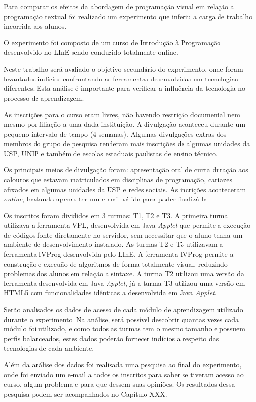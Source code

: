 Para comparar os efeitos da abordagem de programação visual em relação a programação textual foi realizado um experimento que inferiu a carga de trabalho incorrida aos alunos.

O experimento foi composto de um curso de Introdução à Programação desenvolvido no LInE sendo conduzido totalmente online.

Neste trabalho será avaliado o objetivo secundário do experimento, onde foram levantados indícios confrontando as ferramentas desenvolvidas em tecnologias diferentes. Esta análise é importante para verificar a influência da tecnologia no processo de aprendizagem.

As inscrições para o curso eram livres, não havendo restrição documental nem mesmo por filiação a uma dada instituição. A divulgação aconteceu durante um pequeno intervalo de tempo (4 semanas). Algumas divulgações extras dos membros do grupo de pesquisa renderam mais inscrições de algumas unidades da USP, UNIP e também de escolas estaduais paulistas de ensino técnico.

Os principais meios de divulgação foram: apresentação oral de curta duração aos calouros que estavam matriculados em disciplinas de programação, cartazes afixados em algumas unidades da USP e redes sociais. As incrições aconteceram \emph{online}, bastando apenas ter um e-mail válido para poder finalizá-la.

Os inscritos foram divididos em 3 turmas: T1, T2 e T3. A primeira turma utilizava a ferramenta VPL, desenvolvida em Java \emph{Applet} que permite a execução de códigos-fonte diretamente no servidor, sem necessitar que o aluno tenha um ambiente de desenvolvimento instalado. As turmas T2 e T3 utilizavam a ferramenta IVProg desenvolvida pelo LInE. A ferramenta IVProg permite a construção e execuão de algoritmos de forma totalmente visual, reduzindo problemas dos alunos em relação a sintaxe. A turma T2 utilizou uma versão da ferramenta desenvolvida em Java \emph{Applet}, já a turma T3 utilizou uma versão em HTML5 com funcionalidades idênticas a desenvolvida em Java \emph{Applet}.

Serão analisados os dados de acesso de cada módulo de aprendizagem utilizado durante o experimento. Na análise, será possível descobrir quantas vezes cada módulo foi utilizado, e como todos as turmas tem o mesmo tamanho e possuem perfis balanceados, estes dados poderão fornecer indícios a respeito das tecnologias de cada ambiente. 

Além da análise dos dados foi realizada uma pesquisa ao final do experimento, onde foi enviado um e-mail a todos os inscritos para saber se tiveram acesso ao curso, algum problema e para que dessem suas opiniões. Os resultados dessa pesquisa podem ser acompanhados no Capítulo XXX.


